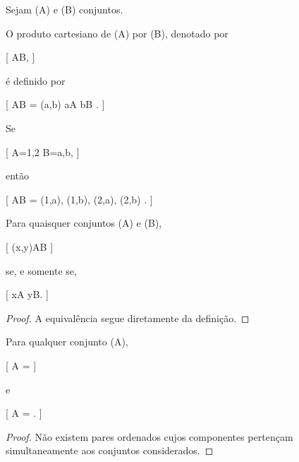 \documentclass[../../main]{subfiles}
\begin{document}
\begin{defn}
	\label{def:matematica:teoria-conjuntos:produto-cartesiano:produto-cartesiano}

	Sejam (A) e (B) conjuntos.

	O produto cartesiano de (A) por (B), denotado por

		[
			A\times B,
		]

	é definido por

	[
	A\times B
	=
	{
	(a,b)
	\mid
	a\in A
	\land
	b\in B
	}.
	]

\end{defn}

\begin{ex}

	Se

	[
	A={1,2}
	\quad{}\quad
	B={a,b},
	]

	então

	[
	A\times B
	=
	{
	(1,a),
	(1,b),
	(2,a),
	(2,b)
	}.
	]

\end{ex}

\begin{prop}
	\label{prop:matematica:teoria-conjuntos:produto-cartesiano:caracterizacao}

	Para quaisquer conjuntos (A) e (B),

	[
			(x,y)\in A\times B
		]

	se, e somente se,

	[
			x\in A
			\quad\text{e}\quad
			y\in B.
		]

\end{prop}

\begin{proof}

	A equivalência segue diretamente da definição.

\end{proof}

\begin{prop}
	\label{prop:matematica:teoria-conjuntos:produto-cartesiano:vazio}

	Para qualquer conjunto (A),

	[
			A\times\varnothing
			=
			\varnothing
		]

	e

		[
			\varnothing\times A
			=
			\varnothing.
		]

\end{prop}

\begin{proof}

	Não existem pares ordenados cujos componentes pertençam
	simultaneamente aos conjuntos considerados.

\end{proof}
\end{document}
